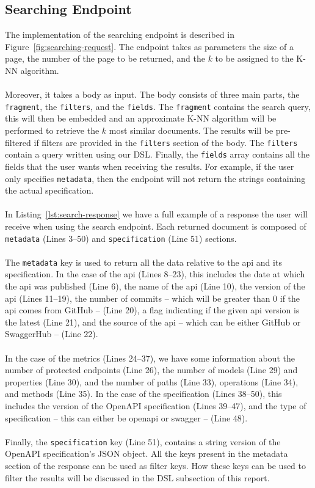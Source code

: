 \subsection{Searching Endpoint}\label{subsec:searching-endpoint}
The implementation of the searching endpoint is described in Figure~\ref{fig:searching-request}.
The endpoint takes as parameters the size of a page, the number of the page to be returned, and the $k$ to be assigned to the K-NN algorithm. \\ \\
Moreover, it takes a body as input.
The body consists of three main parts, the \verb|fragment|, the \verb|filters|, and the \verb|fields|.
The \verb|fragment| contains the search query, this will then be embedded and an approximate K-NN algorithm will be performed to retrieve the $k$ most similar documents.
The results will be pre-filtered if filters are provided in the \verb|filters| section of the body.
The \verb|filters| contain a query written using our DSL\@.
Finally, the \verb|fields| array contains all the fields that the user wants when receiving the results.
For example, if the user only specifies \verb|metadata|, then the endpoint will not return the strings containing the actual specification. \\ \\
In Listing~\ref{lst:search-response} we have a full example of a response the user will receive when using the search endpoint.
Each returned document is composed of \verb|metadata| (Lines 3--50) and \verb|specification| (Line 51) sections. \\ \\
The \verb|metadata| key is used to return all the data relative to the api and its specification.
In the case of the api (Lines 8--23), this includes the date at which the api was published (Line 6), the name of the api (Line 10), the version of the api (Lines 11--19), the number of commits -- which will be greater than 0 if the api comes from GitHub -- (Line 20), a flag indicating if the given api version is the latest (Line 21), and the source of the api -- which can be either GitHub or SwaggerHub -- (Line 22). \\ \\
In the case of the metrics (Lines 24--37), we have some information about the number of protected endpoints (Line 26), the number of models (Line 29) and properties (Line 30), and the number of paths (Line 33), operations (Line 34), and methods (Line 35).
In the case of the specification (Lines 38--50), this includes the version of the OpenAPI specification (Lines 39--47), and the type of specification -- this can either be openapi or swagger -- (Line 48). \\ \\
Finally, the \verb|specification| key (Line 51), contains a string version of the OpenAPI specification's JSON object.
All the keys present in the metadata section of the response can be used as filter keys.
How these keys can be used to filter the results will be discussed in the DSL subsection of this report.

